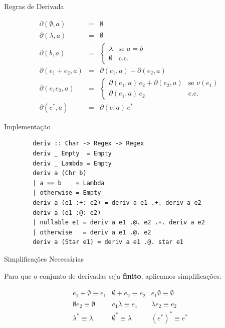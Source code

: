 \begin{frame}{Regras de Derivada}

    \[\begin{array}{lcl}
    \partial(\emptyset, a) &=& \emptyset \\
    \partial(\lambda, a) &=& \emptyset \\
    \partial(b, a) &=& \begin{cases} \lambda & \text{se } a = b \\ \emptyset & \text{c.c.} \end{cases} \\
    \partial(e_1 + e_2, a) &=& \partial(e_1,a) + \partial(e_2,a) \\
    \partial(e_1 e_2, a) &=& \begin{cases} \partial(e_1,a)\,e_2 + \partial(e_2,a) & \text{se } \nu(e_1) \\ \partial(e_1,a)\,e_2 & \text{c.c.} \end{cases} \\
    \partial(e^*, a) &=& \partial(e,a)\,e^*
\end{array}\]
\end{frame}

\begin{frame}[fragile]{Implementação}

    \begin{lstlisting}
        deriv :: Char -> Regex -> Regex
        deriv _ Empty  = Empty
        deriv _ Lambda = Empty
        deriv a (Chr b)
        | a == b    = Lambda
        | otherwise = Empty
        deriv a (e1 :+: e2) = deriv a e1 .+. deriv a e2
        deriv a (e1 :@: e2)
        | nullable e1 = deriv a e1 .@. e2 .+. deriv a e2
        | otherwise   = deriv a e1 .@. e2
        deriv a (Star e1) = deriv a e1 .@. star e1
    \end{lstlisting}
\end{frame}

\begin{frame}{Simplificações Necessárias}

    Para que o conjunto de derivadas seja \textbf{finito}, aplicamos
    simplificações:

    \[\begin{array}{ccc}
    e_1 + \emptyset \equiv e_1 &
    \emptyset + e_2 \equiv e_2 &
    e_1 \emptyset \equiv \emptyset \\
    \emptyset e_2 \equiv \emptyset &
    e_1 \lambda \equiv e_1 &
    \lambda e_2 \equiv e_2 \\
    \lambda^* \equiv \lambda &
    \emptyset^* \equiv \lambda &
    (e^*)^* \equiv e^*
\end{array}\]
\end{frame}

